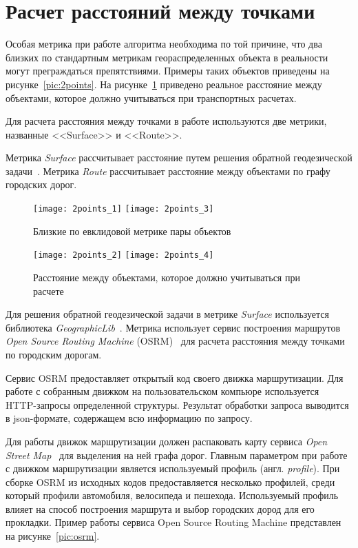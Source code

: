 \section{Расчет расстояний между точками} \label{sec:distance}

Особая метрика при работе алгоритма необходима по той причине, что два близких по стандартным метрикам геораспределенных объекта в реальности могут преграждаться препятствиями. Примеры таких объектов приведены на рисунке~\ref{pic:2points}. На рисунке~\ref{pic:2points-1} приведено реальное расстояние между объектами, которое должно учитываться при транспортных расчетах.

Для расчета расстояния между точками в работе используются две метрики, названные <<Surface>> и <<Route>>.

Метрика \emph{Surface} рассчитывает расстояние путем решения обратной геодезической задачи~\cite[с. 48-50]{geodesic}. Метрика \emph{Route} рассчитывает расстояние между объектами по графу городских дорог.

\begin{figure}[t!]
    \centering
    \texttt{[image: 2points\_1]} \hspace{1ex}
    \texttt{[image: 2points\_3]} \\[.5ex]
    \parbox{.9\textwidth}{\caption{Близкие по евклидовой метрике пары объектов}\label{pic:2points}}
    \texttt{[image: 2points\_2]} \hspace{1ex}
    \texttt{[image: 2points\_4]} \\[.5ex]
    \parbox{.9\textwidth}{\caption{Расстояние между объектами, которое должно учитываться при расчете}\label{pic:2points-1}}
\end{figure}

Для решения обратной геодезической задачи в метрике \emph{Surface} используется библиотека \emph{GeographicLib}~\cite{geographiclib}. Метрика использует сервис построения маршрутов \emph{Open Source Routing Machine} (OSRM)~\cite{OSRM} для расчета расстояния между точками по городским дорогам.

Сервис OSRM предоставляет открытый код своего движка маршрутизации. Для работе с собранным движком на пользовательском компьюре используется HTTP-запросы определенной структуры. Результат обработки запроса выводится в json-формате, содержащем всю информацию по запросу.

Для работы движок маршрутизации должен распаковать карту сервиса \emph{Open Street Map}~\cite{OSM} для выделения на ней графа дорог. Главным параметром при работе с движком маршрутизации является используемый профиль (англ. \emph{profile}). При сборке OSRM из исходных кодов предоставляется несколько профилей, среди который профили автомобиля, велосипеда и пешехода. Используемый профиль влияет на способ построения маршрута и выбор городских дород для его прокладки. Пример работы сервиса Open Source Routing Machine представлен на рисунке~\ref{pic:osrm}.

